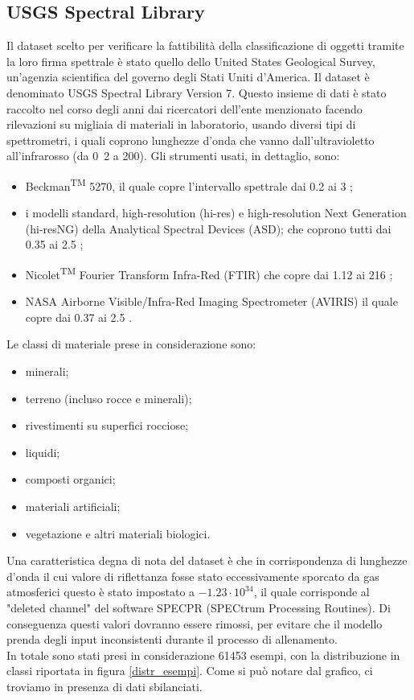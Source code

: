 \subsection{USGS Spectral Library}
Il dataset scelto per verificare la fattibilità della classificazione di oggetti tramite la loro firma spettrale è stato quello dello United States
Geological Survey, un'agenzia scientifica del governo degli Stati Uniti d'America.
Il dataset è denominato USGS Spectral Library Version 7.
Questo insieme di dati è stato raccolto nel corso degli anni dai ricercatori dell'ente menzionato facendo rilevazioni su migliaia di materiali in laboratorio,
usando diversi tipi di spettrometri, i quali coprono lunghezze d'onda che vanno dall'ultravioletto all'infrarosso (da \unit{0.2}{\micro\meter} a \unit{200}{\micro\meter}).
Gli strumenti usati, in dettaglio, sono:
\begin{itemize}
    \item Beckman\textsuperscript{TM} 5270, il quale copre l'intervallo spettrale dai 0.2 ai 3 \micro\meter;
    \item i modelli standard, high-resolution (hi-res) e high-resolution Next Generation (hi-resNG) della Analytical Spectral Devices (ASD);
          che coprono tutti dai 0.35 ai 2.5 \micro\meter;
    \item Nicolet\textsuperscript{TM} Fourier Transform Infra-Red (FTIR) che copre dai 1.12 ai 216 \micro\meter;
    \item NASA Airborne Visible/Infra-Red Imaging Spectrometer (AVIRIS) il quale copre dai 0.37 ai 2.5 \micro\meter.
\end{itemize}
Le classi di materiale prese in considerazione sono:
\begin{itemize}
    \item minerali;
    \item terreno (incluso rocce e minerali);
    \item rivestimenti su superfici rocciose;
    \item liquidi;
    \item composti organici;
    \item materiali artificiali;
    \item vegetazione e altri materiali biologici.
\end{itemize}
Una caratteristica degna di nota del dataset è che in corrispondenza di lunghezze d'onda il cui valore di riflettanza fosse stato eccessivamente sporcato da gas atmosferici questo è stato impostato a $-1.23 \cdot 10^{34}$, il quale corrisponde al "deleted channel" del software SPECPR (SPECtrum Processing Routines). Di conseguenza questi valori dovranno essere rimossi, per evitare che il modello prenda degli input inconsistenti durante il processo di allenamento.\\
In totale sono stati presi in considerazione 61453 esempi, con la distribuzione in classi riportata in figura \ref*{distr_esempi}. Come si può notare dal grafico, ci troviamo in presenza di dati sbilanciati.

